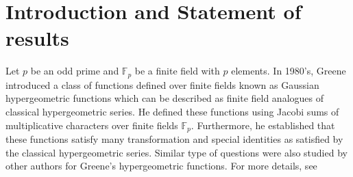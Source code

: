 \documentclass[12pt]{amsart}
\theoremstyle{plain}
\theoremstyle{definition}
\theoremstyle{remark}
\newcommand{\F}{\mathbb{F}}
\numberwithin{equation}{section}
\begin{document}
	\section{Introduction and Statement of results}
	Let $p$ be an odd prime and $\F_p$ be a finite field with $p$ elements. In 1980's, Greene \cite{greene} introduced a class of functions defined over finite fields known as Gaussian hypergeometric functions which can be described as finite field analogues of classical hypergeometric series.  
	He defined these functions using Jacobi sums of multiplicative characters over finite fields $\F_p.$ Furthermore, he established that these functions satisfy many transformation and special identities as satisfied by the classical hypergeometric series. Similar type of questions were also studied by other authors for Greene's hypergeometric functions. For more details, see \cite{Evan-Greene1, Evan-Greene2, 
}
\end{document}
